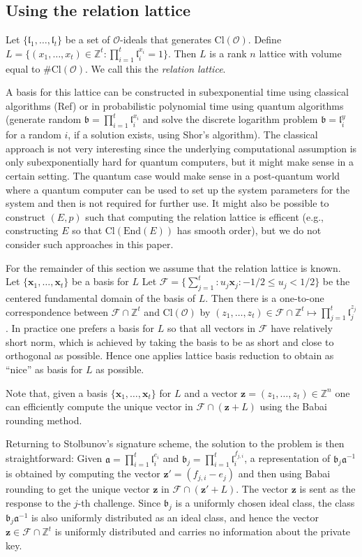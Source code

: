 \documentclass{llncs}
\newcommand{\FF}{\mathcal{F}}
\newcommand{\OO}{\mathcal{O}}
\newcommand{\Z}{\mathbb{Z}}
\newcommand{\End}{\text{End}}
\newcommand{\Cl}{\text{Cl}}
\renewcommand{\a}{\mathfrak{a}}
\renewcommand{\b}{\mathfrak{b}}
\renewcommand{\l}{\mathfrak{l}}
\newcommand{\x}{\textbf{x}}
\newcommand{\z}{\textbf{z}}
\begin{document}
\subsection{Using the relation lattice}

Let $\{ \l_1, \dots, \l_t \}$ be a set of $\OO$-ideals that generates $\Cl( \OO )$.
Define $L = \{ (x_1, \dots, x_t ) \in \Z^t : \prod_{i=1}^t \l_i^{x_i} = 1 \}$.
Then $L$ is a rank $n$ lattice with volume equal to $\#\Cl(\OO)$.
We call this the \emph{relation lattice}.

A basis for this lattice can be constructed in subexponential time using classical algorithms (Ref) or in probabilistic polynomial time using quantum algorithms (generate random $\b = \prod_{i=1}^t \l_i^{x_i} $ and solve the discrete logarithm problem $\b = \l_i^{y}$ for a random $i$, if a solution exists, using Shor's algorithm).
The classical approach is not very interesting since the underlying computational assumption is only subexponentially hard for quantum computers, but it might make sense in a certain setting.
The quantum case would make sense in a post-quantum world where a quantum computer can be used to set up the system parameters for the system and then is not required for further use.
It might also be possible to construct $(E, p )$ such that computing the relation lattice is efficent (e.g., constructing $E$ so that $\Cl( \End(E))$ has smooth order), but we do not consider such approaches in this paper.

For the remainder of this section we assume that the relation lattice is known.
Let $\{ \x_1, \dots, \x_t \}$ be a basis for $L$
Let $\FF = \{ \sum_{j=1}^t : u_j \x_j : -1/2 \le u_j < 1/2 \}$ be the centered fundamental domain of the basis of $L$.
Then there is a one-to-one correspondence between $\FF \cap \Z^t$ and $\Cl(\OO)$ by
$(z_1, \dots, z_t ) \in \FF \cap \Z^t  \mapsto \prod_{j=1}^t \l_j^{z_j}$.
In practice one prefers a basis for $L$ so that all vectors in $\FF$ have relatively short norm, which is achieved by taking the basis to be as short and close to orthogonal as possible. Hence one applies lattice basis reduction to obtain as ``nice'' as basis for $L$ as possible.

Note that, given a basis $\{ \x_1, \dots, \x_t \}$ for $L$ and a vector $\z = (z_1, \dots, z_t ) \in \Z^n$ one can efficiently compute the unique vector in $\FF \cap (\z + L )$ using the Babai rounding method.



Returning to Stolbunov's signature scheme, the solution to the problem is then straightforward:
Given $\a = \prod_{i=1}^t \l_i^{e_i}$ and $\b_j = \prod_{i=1}^t \l_i^{f_{j,i}}$,
a representation of $\b_j \a^{-1}$ is obtained by computing the vector $\z' = (f_{j,i} - e_j)$
and then using Babai rounding to get the unique vector $\z$ in $\FF \cap (\z' + L )$.
The vector $\z$ is sent as the response to the $j$-th challenge.
Since $\b_j$ is a uniformly chosen ideal class, the class $\b_j \a^{-1}$ is also uniformly distributed as an ideal class, and hence the vector $\z \in \FF \cap \Z^t$ is uniformly distributed and carries no information about the private key.
\end{document}
